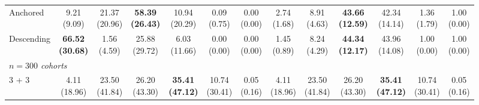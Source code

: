 {\begin{tabular}{l|cccccc|cccccc}
Anchored & \makecell{9.21 \\ (9.09)} & \makecell{21.37 \\ (20.96)} & {\cellcolor[HTML]{C8E6C9}} \bfseries \makecell{58.39 \\ (26.43)} & \makecell{10.94 \\ (20.29)} & \makecell{0.09 \\ (0.75)} & \makecell{0.00 \\ (0.00)} & \makecell{2.74 \\ (1.68)} & \makecell{8.91 \\ (4.63)} & {\cellcolor[HTML]{C8E6C9}} \bfseries \makecell{43.66 \\ (12.59)} & \makecell{42.34 \\ (14.14)} & \makecell{1.36 \\ (1.79)} & \makecell{1.00 \\ (0.00)} \\
Descending & \bfseries \makecell{66.52 \\ (30.68)} & \makecell{1.56 \\ (4.59)} & {\cellcolor[HTML]{C8E6C9}} \makecell{25.88 \\ (29.72)} & \makecell{6.03 \\ (11.66)} & \makecell{0.00 \\ (0.00)} & \makecell{0.00 \\ (0.00)} & \makecell{1.45 \\ (0.89)} & \makecell{8.24 \\ (4.29)} & {\cellcolor[HTML]{C8E6C9}} \bfseries \makecell{44.34 \\ (12.17)} & \makecell{43.96 \\ (14.08)} & \makecell{1.00 \\ (0.00)} & \makecell{1.00 \\ (0.00)} \\
\midrule
\multicolumn{13}{l}{\emph{$n = 300$ cohorts}} \\
3 + 3 & \makecell{4.11 \\ (18.96)} & \makecell{23.50 \\ (41.84)} & {\cellcolor[HTML]{C8E6C9}} \makecell{26.20 \\ (43.30)} & \bfseries \makecell{35.41 \\ (47.12)} & \makecell{10.74 \\ (30.41)} & \makecell{0.05 \\ (0.16)} & \makecell{4.11 \\ (18.96)} & \makecell{23.50 \\ (41.84)} & {\cellcolor[HTML]{C8E6C9}} \makecell{26.20 \\ (43.30)} & \bfseries \makecell{35.41 \\ (47.12)} & \makecell{10.74 \\ (30.41)} & \makecell{0.05 \\ (0.16)} \\

\end{tabular}}
